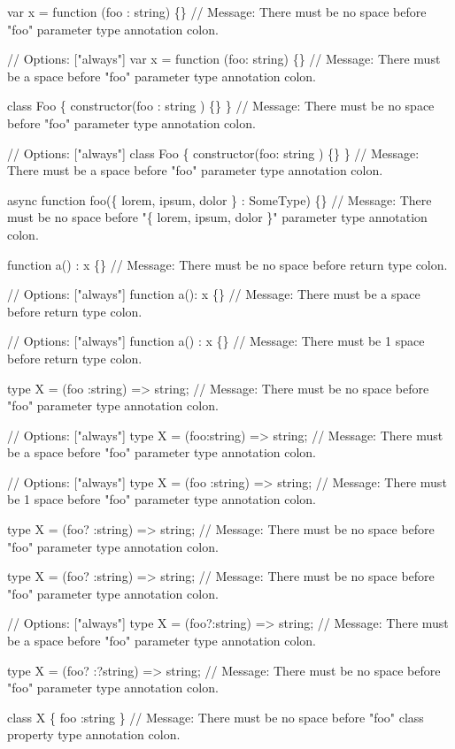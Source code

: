 \begin{DoxyCode}
var x = function (foo : string) \{\}
// Message: There must be no space before "foo" parameter type annotation colon.

// Options: ["always"]
var x = function (foo: string) \{\}
// Message: There must be a space before "foo" parameter type annotation colon.

class Foo \{ constructor(foo : string ) \{\} \}
// Message: There must be no space before "foo" parameter type annotation colon.

// Options: ["always"]
class Foo \{ constructor(foo: string ) \{\} \}
// Message: There must be a space before "foo" parameter type annotation colon.

async function foo(\{ lorem, ipsum, dolor \} : SomeType) \{\}
// Message: There must be no space before "\{ lorem, ipsum, dolor \}" parameter type annotation colon.

function a() : x \{\}
// Message: There must be no space before return type colon.

// Options: ["always"]
function a(): x \{\}
// Message: There must be a space before return type colon.

// Options: ["always"]
function a()  : x \{\}
// Message: There must be 1 space before return type colon.

type X = (foo :string) => string;
// Message: There must be no space before "foo" parameter type annotation colon.

// Options: ["always"]
type X = (foo:string) => string;
// Message: There must be a space before "foo" parameter type annotation colon.

// Options: ["always"]
type X = (foo  :string) => string;
// Message: There must be 1 space before "foo" parameter type annotation colon.

type X = (foo? :string) => string;
// Message: There must be no space before "foo" parameter type annotation colon.

type X = (foo?     :string) => string;
// Message: There must be no space before "foo" parameter type annotation colon.

// Options: ["always"]
type X = (foo?:string) => string;
// Message: There must be a space before "foo" parameter type annotation colon.

type X = (foo? :?string) => string;
// Message: There must be no space before "foo" parameter type annotation colon.

class X \{ foo :string \}
// Message: There must be no space before "foo" class property type annotation colon.


\end{DoxyCode}
